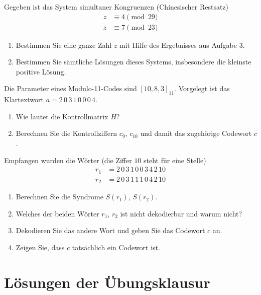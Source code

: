\begin{aufgabe}[Aufgabe 4]
Gegeben ist das System simultaner Kongruenzen (Chinesischer Restsatz)
\begin{align*}
  z &\equiv 4 \pmod{29}\\
  z &\equiv 7 \pmod{23}
\end{align*}
\begin{enumerate}[label=\alph*)]
  \item Bestimmen Sie eine ganze Zahl $z$ mit Hilfe des Ergebnisses aus Aufgabe 3.
  \item Bestimmen Sie sämtliche Lösungen dieses Systems, insbesondere die kleinste positive Lösung.
\end{enumerate}
\end{aufgabe}

\begin{aufgabe}[Aufgabe 5]
Die Parameter eines Modulo-11-Codes sind $[10, 8, 3]_{11}$.
Vorgelegt ist das Klartextwort $a = 2\,0\,3\,1\,0\,0\,0\,4$.
\begin{enumerate}[label=\alph*)]
  \item Wie lautet die Kontrollmatrix $H$?
  \item Berechnen Sie die Kontrollziffern $c_9$, $c_{10}$ und damit das zugehörige Codewort $c$.
\end{enumerate}
Empfangen wurden die Wörter (die Ziffer $10$ steht für eine Stelle)
\begin{align*}
  r_1 &= 2\,0\,3\,1\,0\,0\,3\,4\,2\,10\\
  r_2 &= 2\,0\,3\,1\,1\,1\,0\,4\,2\,10
\end{align*}
\begin{enumerate}[label=\alph*), start=3]
  \item Berechnen Sie die Syndrome $S(r_1)$, $S(r_2)$.
  \item Welches der beiden Wörter $r_1$, $r_2$ ist nicht dekodierbar und warum nicht?
  \item Dekodieren Sie das andere Wort und geben Sie das Codewort $c$ an.
  \item Zeigen Sie, dass $c$ tatsächlich ein Codewort ist.
\end{enumerate}
\end{aufgabe}

\clearpage
\section{Lösungen der Übungsklausur}

